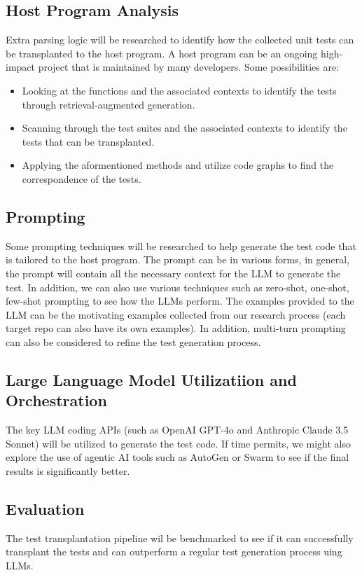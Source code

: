 \documentclass[sigconf]{acmart}
\begin{document}
\subsection{Host Program Analysis}
Extra parsing logic will be researched to identify how the collected unit tests can be transplanted to the host program. A host program can be an ongoing high-impact project that is maintained by many developers. Some possibilities are:
\begin{itemize}
\item Looking at the functions and the associated contexts to identify the tests through retrieval-augmented generation.
\item Scanning through the test suites and the associated contexts to identify the tests that can be transplanted.
\item Applying the aformentioned methods and utilize code graphs to find the correspondence of the tests.
\end{itemize}

\subsection{Prompting}
Some prompting techniques will be researched to help generate the test code that is tailored to the host program. The prompt can be in various forms, in general, the prompt will contain all the necessary context for the LLM to generate the test. In addition, we can also use various techniques such as zero-shot, one-shot, few-shot prompting to see how the LLMs perform. The examples provided to the LLM can be the motivating examples collected from our research process (each target repo can also have its own examples). In addition, multi-turn prompting can also be considered to refine the test generation process.

\subsection{Large Language Model Utilizatiion and Orchestration}
The key LLM coding APIs (such as OpenAI GPT-4o and Anthropic Claude 3.5 Sonnet) will be utilized to generate the test code. If time permits, we might also explore the use of agentic AI tools such as AutoGen or Swarm to see if the final results is significantly better.



\subsection{Evaluation}
The test transplantation pipeline wil be benchmarked to see if it can successfully transplant the tests and can outperform a regular test generation process uing LLMs.
\end{document}
